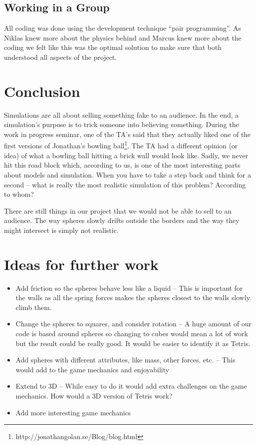 \documentclass[11pt]{article} %
\begin{document}
\subsection{Working in a Group}
All coding was done using the development technique ``pair programming''. As Niklas knew more about the physics behind and Marcus knew more about the coding we felt like this was the optimal solution to make sure that both understood all aspects of the project.

\section{Conclusion}
Simulations are all about selling something fake to an audience. In the end, a simulation's purpose is to trick someone into believing something. During the work in progress seminar, one of the TA's said that they actually liked one of the first versions of Jonathan's bowling ball\footnote{http://jonathangolan.se/Blog/blog.html}. The TA had a different opinion (or idea) of what a bowling ball hitting a brick wall would look like. Sadly, we never hit this road block which, according to us, is one of the most interesting parts about models and simulation. When you have to take a step back and think for a second -- what is really the most realistic simulation of this problem? According to whom?

There are still things in our project that we would not be able to sell to an audience. The way spheres slowly drifts outside the borders and the way they might intersect is simply not realistic. 

\section{Ideas for further work}
\begin{itemize}
\item{Add friction so the spheres behave less like a liquid -- This is important for the walls as all the spring forces makes the spheres closest to the walls slowly climb them.}
\item{Change the spheres to squares, and consider rotation -- A huge amount of our code is based around spheres so changing to cubes would mean a lot of work but the result could be really good. It would be easier to identify it as Tetris.}
\item{Add spheres with different attributes, like mass, other forces, etc. -- This would add to the game mechanics and enjoyability}
\item{Extend to 3D -- While easy to do it would add extra challenges on the game mechanics. How would a 3D version of Tetris work?}
\item{Add more interesting game mechanics}
\end{itemize}
\end{document}
